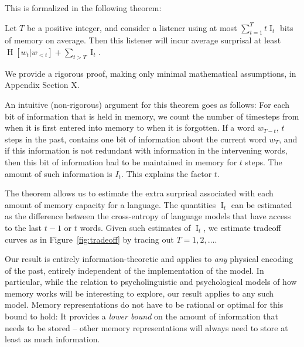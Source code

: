 This is formalized in the following theorem:

\begin{thm}\label{prop:suboptimal}
Let $T$ be a positive integer, and consider a listener using at most $\sum_{t=1}^T t \operatorname{I}_t$ bits of memory on average.
Then this listener will incur average surprisal at least
$\operatorname{H}[w_t|w_{<t}] + \sum_{t > T} \operatorname{I}_t$.
\end{thm}


We provide a rigorous proof, making only minimal mathematical assumptions, in Appendix Section X.

An intuitive (non-rigorous) argument for this theorem goes as follows:
For each bit of information that is held in memory, we count the number of timesteps from when it is first entered into memory to when it is forgotten.
If a word $w_{T-t}$, $t$ steps in the past, contains one bit of information about the current word $w_T$, and if this information is not redundant with information in the intervening words, then this bit of information had to be maintained in memory for $t$ steps.
The amount of such information is $I_t$. This explains the factor $t$.


The theorem allows us to estimate the extra surprisal associated with each amount of memory capacity for a language.
The quantities $\operatorname{I}_t$ can be estimated as the difference between the cross-entropy of language models that have access to the last $t-1$ or $t$ words.
Given such estimates of $\operatorname{I}_t$, we estimate tradeoff curves as in Figure~\ref{fig:tradeoff} by tracing out $T=1, 2, \dots$.


Our result is entirely information-theoretic and applies to \emph{any} physical encoding of the past, entirely independent of the implementation of the model. %
In particular, while the relation to psycholinguistic and psychological models of how memory works will be interesting to explore, our result applies to any such model.
Memory representations do not have to be rational or optimal for this bound to hold:
It provides a \emph{lower bound} on the amount of information that needs to be stored -- other memory representations will always need to store at least as much information.








